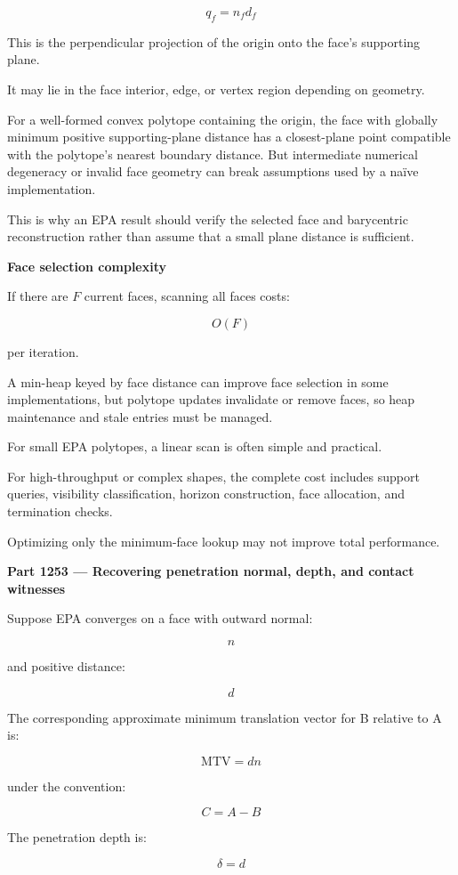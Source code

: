 \[
\boxed{ q_f=n_fd_f }
\]

This is the perpendicular projection of the origin onto the face's supporting plane.

It may lie in the face interior, edge, or vertex region depending on geometry.

For a well-formed convex polytope containing the origin, the face with globally minimum positive supporting-plane distance has a closest-plane point compatible with the polytope's nearest boundary distance. But intermediate numerical degeneracy or invalid face geometry can break assumptions used by a naïve implementation.

This is why an EPA result should verify the selected face and barycentric reconstruction rather than assume that a small plane distance is sufficient.

\textbf{Face selection complexity}

If there are \(F\) current faces, scanning all faces costs:

\[
O(F)
\]

per iteration.

A min-heap keyed by face distance can improve face selection in some implementations, but polytope updates invalidate or remove faces, so heap maintenance and stale entries must be managed.

For small EPA polytopes, a linear scan is often simple and practical.

For high-throughput or complex shapes, the complete cost includes support queries, visibility classification, horizon construction, face allocation, and termination checks.

Optimizing only the minimum-face lookup may not improve total performance.

\textbf{Part 1253 --- Recovering penetration normal, depth, and contact witnesses}

Suppose EPA converges on a face with outward normal:

\[
n
\]

and positive distance:

\[
d
\]

The corresponding approximate minimum translation vector for B relative to A is:

\[
\boxed{ \mathrm{MTV}=dn }
\]

under the convention:

\[
C=A-B
\]

The penetration depth is:

\[
\boxed{\delta=d}
\]

